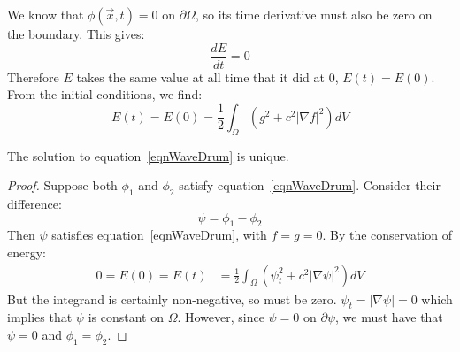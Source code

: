 \documentclass[../Main.tex]{subfiles}
\begin{document}
We know that $\phi(\vec{x}, t) = 0$ on $\partial \Omega$, so its time derivative must also be zero on the boundary. This gives:
\begin{equation*}
    \frac{dE}{dt} = 0
\end{equation*}
Therefore $E$ takes the same value at all time that it did at $0$, $E(t) = E(0)$. From the initial conditions, we find:
\begin{equation*}
    E(t) = E(0) = \frac12 \int_{\Omega} \left(g^2 + c^2 |\nabla f|^2\right) dV
\end{equation*}
\begin{proposition}
    The solution to equation~\ref{eqnWaveDrum} is unique.
    \label{propWaveUnique}
\end{proposition}
\begin{proof}
    Suppose both $\phi_1$ and $\phi_2$ satisfy equation~\ref{eqnWaveDrum}. Consider their difference:
    \begin{equation*}
        \psi = \phi_1 - \phi_2
    \end{equation*}
    Then $\psi$ satisfies equation~\ref{eqnWaveDrum}, with $f = g = 0$. By the conservation of energy:
    \begin{align*}
        0 = E(0) = E(t) &= \frac12 \int_\Omega \left(\psi_t^2 + c^2 |\nabla \psi|^2\right) dV
    \end{align*}
    But the integrand is certainly non-negative, so must be zero. $\psi_t = |\nabla \psi| = 0$ which implies that $\psi$ is constant on $\Omega$. However, since $\psi = 0$ on $\partial \psi$, we must have that $\psi = 0$ and $\phi_1 = \phi_2$.
\end{proof}
\end{document}
